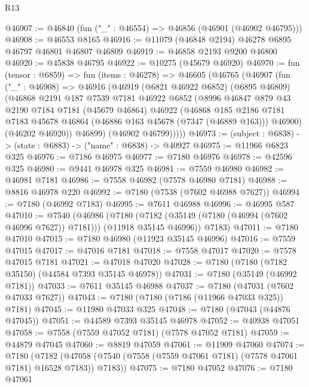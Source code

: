 \begin{lexlean}{R13}
\begin{coremodule}
@46907 := @46840 (fun ("_" : @46554) => @46856 (@46901 (@46902 @46795)))
@46908 := @46553 @8165
@46916 := @11079 (@46848 @2194) @46278 @6895 @46797 @46801 @46807 @46809
@46919 := @46858 @2193 @9200 @46800
@46920 := @45838 @46795
@46922 := @10275 (@45679 @46920)
@46970 := fun (tensor : @6859) =>
  fun (items : @46278) =>
  @46605
    (@46765
      (@46907
        (fun ("_" : @46908) =>
        @46916
          (@46919
            (@6821 @46922 @6852)
            (@6895 @46809)
            (@46868
              @2191
              @187
              @7539
              @7181
              @46922
              @6852
              (@8996
                @46847
                @879
                @43
                @2190
                @7184
                @7181
                (@45679 @46864)
                @46922
                (@46868
                  @185
                  @2186
                  @7181
                  @7183
                  @45678
                  @46864
                  (@46886 @163 @45678 (@7347 (@46889 @163)))
                  @46900)
                (@46202 @46920))
              @46899)
            (@46902 @46799)))))
@46973 := (subject : @6838) -> (state : @6883) -> ("name" : @6838) -> @40927
@46975 := @11966 @6823 @325
@46976 := @7186 @46975
@46977 := @7180 @46976
@46978 := @42596 @325
@46980 := @9441 @46978 @325
@46981 := @7559 @46980
@46982 := @46981 @7181
@46986 := @7558 @46982 (@7578 @46980 @7181)
@46988 := @8816 @46978 @220
@46992 := @7180 (@7538 (@7602 @46988 @7627))
@46994 := @7180 (@46992 @7183)
@46995 := @7611 @46988
@46996 := @46995 @587
@47010 := @7540
    (@46986
      (@7180 (@7182 (@35149 (@7180 (@46994 (@7602 @46996 @7627)) @7181))) (@11918 @35145 @46996))
      @7183)
@47011 := @7180 @47010
@47015 := @7180 @46980 (@11923 @35145 @46996)
@47016 := @7559 @47015
@47017 := @47016 @7181
@47018 := @7558 @47017
@47020 := @7578 @47015 @7181
@47021 := @47018 @47020
@47028 := @7180 (@7180 (@7182 @35150) (@44584 @7393 @35145 @46978))
@47031 := @7180 (@35149 (@46992 @7181))
@47033 := @7611 @35145 @46988
@47037 := @7180 (@47031 (@7602 @47033 @7627))
@47043 := @7180 (@7180 (@7186 (@11966 @47033 @325)) @7181)
@47045 := @11980 @47033 @325
@47048 := @7180 (@47043 (@44876 @47045))
@47051 := @44589 @7393 @35145 @46978
@47052 := @40938 @47051
@47058 := @7558 (@7559 @47052 @7181) (@7578 @47052 @7181)
@47059 := @44879 @47045
@47060 := @8819 @47059
@47061 := @11909 @47060
@47074 := @7180
    (@7182 (@47058 (@7540 (@7558 (@7559 @47061 @7181) (@7578 @47061 @7181) @16528 @7183)) @7183))
@47075 := @7180 @47052
@47076 := @7180 @47061

\end{coremodule}
\end{lexlean}
